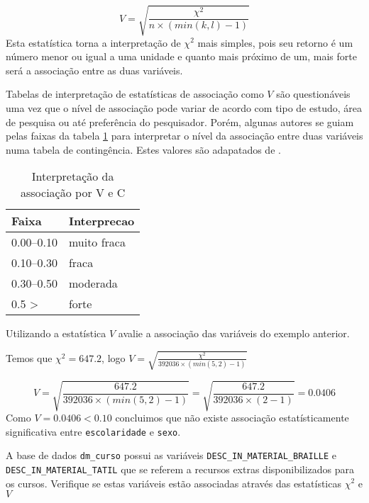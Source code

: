\documentclass[11pt,]{style/krantz}
\theoremstyle{definition}
\theoremstyle{definition}
\theoremstyle{definition}
\theoremstyle{remark}
\let\BeginKnitrBlock\begin \let\EndKnitrBlock\end
\begin{document}
\[V = \sqrt{\frac{\chi^2}{n \times (min(k,l)-1)}}\]
Esta estatística torna a interpretação de \(\chi^2\) mais simples, pois seu retorno é um número menor ou igual a uma unidade e quanto mais próximo de um, mais forte será a associação entre as duas variáveis.

Tabelas de interpretação de estatísticas de associação como \(V\) são questionáveis uma vez que o nível de associação pode variar de acordo com tipo de estudo, área de pesquisa ou até preferência do pesquisador. Porém, algunas autores se guiam pelas faixas da tabela \ref{tab:tab12} para interpretar o nível da associação entre duas variáveis numa tabela de contingência. Estes valores são adapatados de \citep{gravetter2016statistics}.

\begin{table}[!h]

\caption{\label{tab:tab12}Interpretação da associação por V e C}
\centering
\begin{tabular}{ll}
\toprule
Faixa & Interprecao\\
\midrule
0.00--0.10 & muito fraca\\
0.10--0.30 & fraca\\
0.30--0.50 & moderada\\
0.5 > & forte\\
\bottomrule
\end{tabular}
\end{table}

\BeginKnitrBlock{example}
\protect\hypertarget{exm:unnamed-chunk-94}{}{\label{exm:unnamed-chunk-94} }Utilizando a estatística \(V\) avalie a associação das variáveis do exemplo anterior.
\EndKnitrBlock{example}

\BeginKnitrBlock{solution}
\iffalse{} {Solução. } \fi{}Temos que \(\chi^2 = 647.2\), logo \(V = \sqrt{\frac{\chi^2}{392036 \times (min(5,2)-1)}}\)
\EndKnitrBlock{solution}

\[V = \sqrt{\frac{647.2}{392036 \times (min(5,2)-1)}} = \sqrt{\frac{647.2}{392036 \times (2-1)}} = 0.0406\]
Como \(V = 0.0406 < 0.10\) concluimos que não existe associação estatísticamente significativa entre \texttt{escolaridade} e \texttt{sexo}.

\BeginKnitrBlock{exercise}
\protect\hypertarget{exr:unnamed-chunk-96}{}{\label{exr:unnamed-chunk-96} }A base de dados \texttt{dm\_curso} possui as variáveis \texttt{DESC\_IN\_MATERIAL\_BRAILLE} e \texttt{DESC\_IN\_MATERIAL\_TATIL} que se referem a recursos extras disponibilizados para os cursos. Verifique se estas variáveis estão associadas através das estatísticas \(\chi^2\) e \(V\)
\EndKnitrBlock{exercise}
\end{document}
